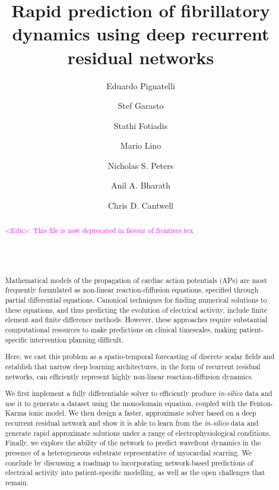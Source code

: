 \documentclass{article}
\title{Rapid prediction of fibrillatory dynamics using deep recurrent residual networks}
\author[1]{Eduardo Pignatelli}
\author[1, 2]{Stef Garasto}
\author[1]{Stathi Fotiadis}
\author[1]{Mario Lino}
\author[1]{Nicholas S. Peters}
\author[1]{Anil A. Bharath}
\author[1]{Chris D. Cantwell}
\affil[1]{Imperial College London}
\affil[2]{University of Greenwich}
\newcommand{\Edu}[1]{\textcolor{magenta}{<Edu>: #1}}
\begin{document}
    \maketitle
    
    \begin{abstract}
    \Edu{This file is now deprecated in favour of frontiers.tex}
    \\ \\ \\ \\ \\ 
    Mathematical models of the propagation of cardiac action potentials (APs) are most frequently formulated as non-linear reaction-diffusion equations, specified through partial differential equations. Canonical techniques for finding numerical solutions to these equations, and thus predicting the evolution of electrical activity, include finite element and finite difference methods. However, these approaches require substantial computational resources to make predictions on clinical timescales, making patient-specific intervention planning difficult. 
    
    Here, we cast this problem as a spatio-temporal forecasting of discrete scalar fields and establish that narrow deep learning architectures, in the form of recurrent residual networks, can efficiently represent highly non-linear reaction-diffusion dynamics.
    
    We first implement a fully differentiable solver to efficiently produce \textit{in-silico} data and use it to generate a dataset using the monodomain equation, coupled with the Fenton-Karma ionic model.
    We then design a faster, approximate solver based on a deep recurrent residual network and show it is able to learn from the \textit{in-silico} data and generate rapid approximate solutions under a range of electrophysiological conditions.
    Finally, we explore the ability of the network to predict wavefront dynamics in the presence of a heterogeneous substrate representative of myocardial scarring.
    We conclude by discussing a roadmap to incorporating network-based predictions of electrical activity into patient-specific modelling, as well as the open challenges that remain.
    \end{abstract}
\end{document}
